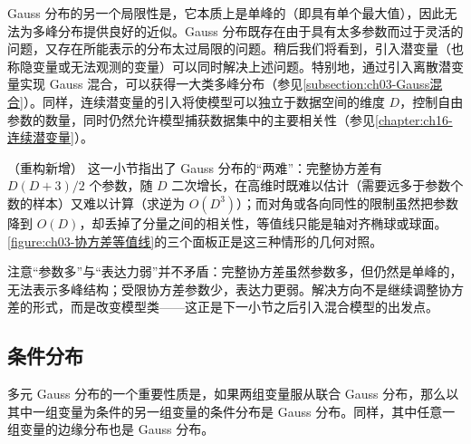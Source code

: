 \documentclass[../../main.tex]{subfiles}
\begin{document}
Gauss 分布的另一个局限性是，它本质上是单峰的（即具有单个最大值），因此无法为多峰分布提供良好的近似。Gauss 分布既存在由于具有太多参数而过于灵活的问题，又存在所能表示的分布太过局限的问题。稍后我们将看到，引入潜变量（也称隐变量或无法观测的变量）可以同时解决上述问题。特别地，通过引入离散潜变量实现 Gauss 混合，可以获得一大类多峰分布（参见\cref{subsection:ch03-Gauss混合}）。同样，连续潜变量的引入将使模型可以独立于数据空间的维度 $D$，控制自由参数的数量，同时仍然允许模型捕获数据集中的主要相关性（参见\cref{chapter:ch16-连续潜变量}）。

\begin{remark}（重构新增）
这一小节指出了 Gauss 分布的“两难”：完整协方差有 $D(D+3)/2$ 个参数，随 $D$ 二次增长，在高维时既难以估计（需要远多于参数个数的样本）又难以计算（求逆为 $O(D^{3})$）；而对角或各向同性的限制虽然把参数降到 $O(D)$，却丢掉了分量之间的相关性，等值线只能是轴对齐椭球或球面。\cref{figure:ch03-协方差等值线}的三个面板正是这三种情形的几何对照。

注意“参数多”与“表达力弱”并不矛盾：完整协方差虽然参数多，但仍然是单峰的，无法表示多峰结构；受限协方差参数少，表达力更弱。解决方向不是继续调整协方差的形式，而是改变模型类——这正是下一小节之后引入混合模型的出发点。
\end{remark}

\subsection{条件分布}\label{subsection:ch03-条件分布}

多元 Gauss 分布的一个重要性质是，如果两组变量服从联合 Gauss 分布，那么以其中一组变量为条件的另一组变量的条件分布是 Gauss 分布。同样，其中任意一组变量的边缘分布也是 Gauss 分布。
\end{document}
